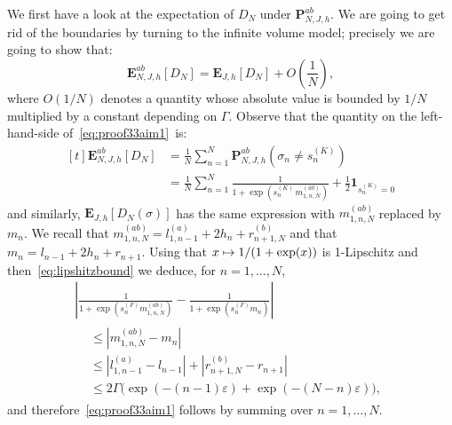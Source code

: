 \documentclass[AHL,Unicode,longabstracts,published]{cedram}
\newcommand{\ind}{\mathbf{1}}
\newcommand{\bP}{\mathbf{P}}
\newcommand{\bE}{\mathbf{E}}
\newcommand{\gep}{\varepsilon}
\newcommand{\gG}{\Gamma}
\newcommand{\gs}{\sigma}
\let\oldmapsto\mapsto
\renewcommand*{\mapsto}{\mathchoice{\longmapsto}{\oldmapsto}{\oldmapsto}{\oldmapsto}}
\begin{document}
We first have a look at the expectation of $D_N$ under $\bP_{N, J, h}^{ab}$. We are going to get rid of the boundaries by turning to the infinite volume model; precisely we are going to show that:
\begin{equation}\label{eq:proof33aim1}
\bE^{ab}_{N, J, h}\left[D_N\right]
= \bE_{J, h}\left[D_N\right]+O\left(\frac1N\right),
\end{equation}
where $O\left(1/N\right)$ denotes a quantity whose absolute value is bounded by $1/N$ multiplied by a constant depending on $\gG$. Observe that the quantity on the left-hand-side of~\eqref{eq:proof33aim1}~is:
\begin{equation}\label{eq:proof33linearity}
\begin{aligned}[t]
\bE^{ab}_{N, J, h}\left[D_N\right] &= \frac 1N \sum_{n=1}^N \bP^{ab}_{N, J, h}\left(\gs_n \neq s^{(K)}_n\right) \\
& = \frac 1N \sum_{n=1}^N \frac {1}{1+ \exp\left(s^{(K)}_n\, m^{(ab)}_{1, n, N}\right)}+\frac12 \ind_{s_n^{(K)}=0}
\end{aligned}
\end{equation}
and similarly, $\bE_{J, h}\left[D_N(\sigma)\right]$ has the same expression with $m^{(ab)}_{1, n, N}$ replaced by $m_n$. We recall that $m^{(ab)}_{1, n, N}=l^{(a)}_{1, n-1} +2h_n+ r^{(b)}_{n+1, N}$ and that $m_n=l_{n-1} +2h_n+ r_{n+1}$. Using that $x\mapsto 1/{(1+\exp(x))}$ is 1-Lipschitz and then~\eqref{eq:lipshitzbound} we deduce, for $n=1, \dots, N$,
\begin{multline}\label{eq:contrlboundeffect}
\left|
\frac 1 {1+ \exp\left(s^{(F)}_n m^{(ab)}_{1, n, N}\right)} - \frac 1 {1+ \exp\left(s^{(F)}_n m_n\right)}
\right|\\
\begin{aligned}
&\le \left|m^{(ab)}_{1, n, N}-m_n\right|\\
&\le \left|l^{(a)}_{1, n-1}-l_{n-1}\right| + \left|r^{(b)}_{n+1, N}-r_{n+1}\right| \\
&\le 2\gG \bigl(\exp(-(n-1)\gep)+ \exp(-(N-n)\gep)\bigr),
\end{aligned}
\end{multline}
and therefore~\eqref{eq:proof33aim1} follows by summing over $n=1, \dots, N$.
\end{document}
